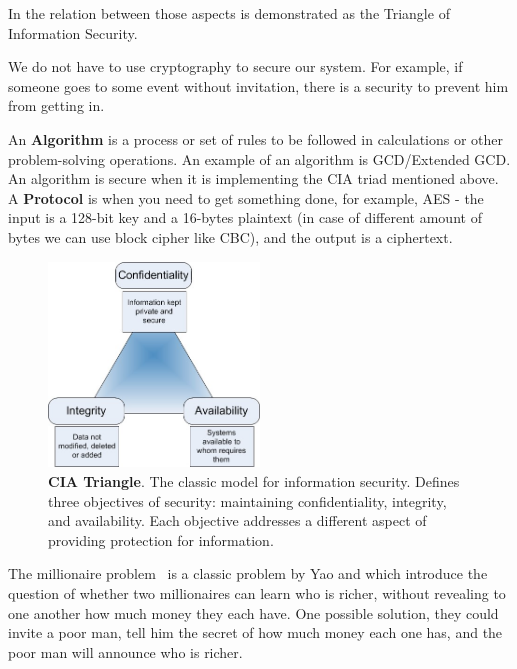 In  the relation between those aspects is demonstrated as the
Triangle of Information Security.

We do not have to use cryptography to secure our system. For example, if someone
goes to some event without invitation, there is a security to prevent him from
getting in.

An \textbf{Algorithm} is a process or set of rules to be followed in
calculations or other problem-solving operations. An example of an algorithm is
GCD/Extended GCD. An algorithm is secure when it is implementing the CIA triad
mentioned above. A \textbf{Protocol} is when you need to get something done, for
example, AES -  the input is a 128-bit key and a 16-bytes plaintext (in case of
different amount of bytes we can use block cipher like CBC), and the output is a ciphertext.

\begin{figure}
    \centering
    \includegraphics[width=0.5\textwidth]{images/ch1_Intro/cia.jpg}
    \caption{\textbf{CIA Triangle}. The classic model for information security. Defines three objectives of security: maintaining confidentiality, integrity, and availability. Each objective addresses a different aspect of providing protection for information.}
    \label{fig:CIA}
\end{figure}

The millionaire problem~\cite{lin2005efficient} is a classic problem by Yao and
which introduce the question of whether two millionaires can learn who is richer, 
without revealing to one another how much money they each have. 
One possible solution, they could invite a poor man, tell him the secret of
how much money each one has, and the poor man will announce who is richer.  

